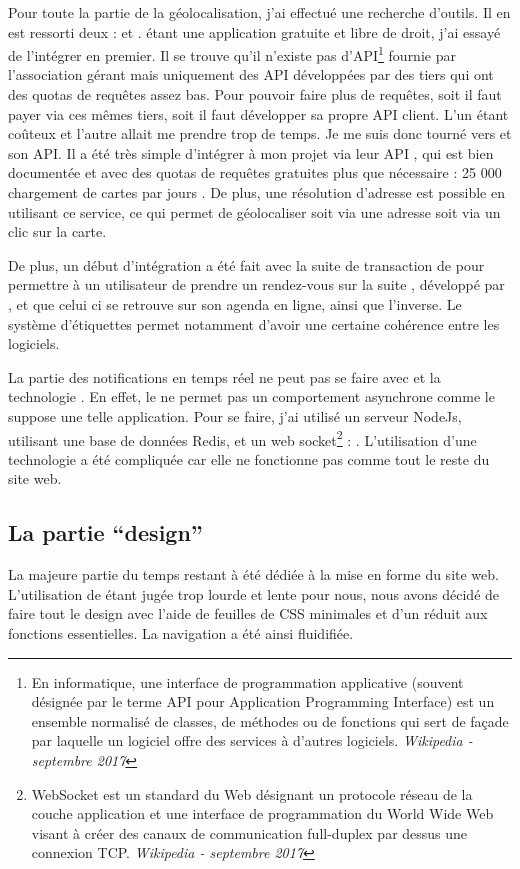 \documentclass[a4paper, 11pt]{report}
\begin{document}
    Pour toute la partie de la géolocalisation, j'ai effectué une recherche d'outils. Il en est ressorti deux : \osm et \gmap. \osm étant une application gratuite et libre de droit, j'ai essayé de l'intégrer en premier. Il se trouve qu'il n'existe pas d'API\footnote{En informatique, une interface de programmation applicative (souvent désignée par le terme API pour Application Programming Interface) est un ensemble normalisé de classes, de méthodes ou de fonctions qui sert de façade par laquelle un logiciel offre des services à d'autres logiciels. \textit{Wikipedia - septembre 2017}} fournie par l'association gérant \osm mais uniquement des API développées par des tiers qui ont des quotas de requêtes assez bas. Pour pouvoir faire plus de requêtes, soit il faut payer via ces mêmes tiers, soit il faut développer sa propre API client. L'un étant coûteux et l'autre allait me prendre trop de temps. Je me suis donc tourné vers \gmap et son API. Il a été très simple d'intégrer \gmap à mon projet via leur API \javascript, qui est bien documentée et avec des quotas de requêtes gratuites plus que nécessaire : 25 000 chargement de cartes par jours \cite{gmap_prices}. De plus, une résolution d'adresse est possible en utilisant ce service, ce qui permet de géolocaliser soit via une adresse soit via un clic sur la carte.

    De plus, un début d'intégration a été fait avec la suite de transaction de \logilink pour permettre à un utilisateur de prendre un rendez-vous sur la suite \ulti, développé par \logilink, et que celui ci se retrouve sur son agenda en ligne, ainsi que l'inverse. Le système d'étiquettes permet notamment d'avoir une certaine cohérence entre les logiciels.

    La partie des notifications en temps réel ne peut pas se faire avec \symfony et la technologie \php. En effet, le \php ne permet pas un comportement asynchrone comme le suppose une telle application. Pour se faire, j'ai utilisé un serveur NodeJs, utilisant une base de données Redis, et un web socket\footnote{WebSocket est un standard du Web désignant un protocole réseau de la couche application et une interface de programmation du World Wide Web visant à créer des canaux de communication full-duplex par dessus une connexion TCP. \textit{Wikipedia - septembre 2017}} : \io. L'utilisation d'une technologie a été compliquée car elle ne fonctionne pas comme tout le reste du site web.

    \subsection{La partie ``design''}
    La majeure partie du temps restant à été dédiée à la mise en forme du site web. L'utilisation de \bootstrap étant jugée trop lourde et lente pour nous, nous avons décidé de faire tout le design avec l'aide de feuilles de CSS minimales et d'un \javascript réduit aux fonctions essentielles. La navigation a été ainsi fluidifiée.
\end{document}
